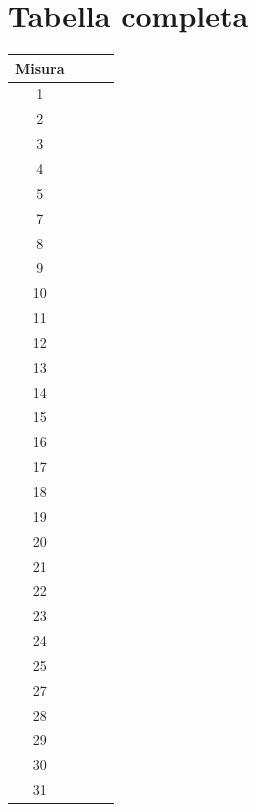 \documentclass[12pt, a4paper]{article}
\begin{document}
\newpage

\section{Tabella completa}
\begin{table}[h!]
    \centering
    \begin{tabular}{|c|c|c|c|}
    \hline
         \footnotesize Misura & & & \\
    \hline
         \footnotesize 1 & & & \\
         \footnotesize 2 & & & \\
         \footnotesize 3 & & & \\
         \footnotesize 4 & & & \\
         \footnotesize 5 & & & \\
         \footnotesize 7 & & & \\
         \footnotesize 8 & & & \\
         \footnotesize 9 & & & \\
         \footnotesize 10 & & & \\
         \footnotesize 11 & & & \\
         \footnotesize 12 & & & \\ 
         \footnotesize 13 & & & \\
         \footnotesize 14 & & & \\
         \footnotesize 15 & & & \\
         \footnotesize 16 & & & \\
         \footnotesize 17 & & & \\
         \footnotesize 18 & & & \\
         \footnotesize 19 & & & \\
         \footnotesize 20 & & & \\
         \footnotesize 21 & & & \\
         \footnotesize 22 & & & \\
         \footnotesize 23 & & & \\
         \footnotesize 24 & & & \\
         \footnotesize 25 & & & \\
         \footnotesize 27 & & & \\
         \footnotesize 28 & & & \\
         \footnotesize 29 & & & \\
         \footnotesize 30 & & & \\
         \footnotesize 31 & & & \\

\end{tabular}
\end{table}
\end{document}
